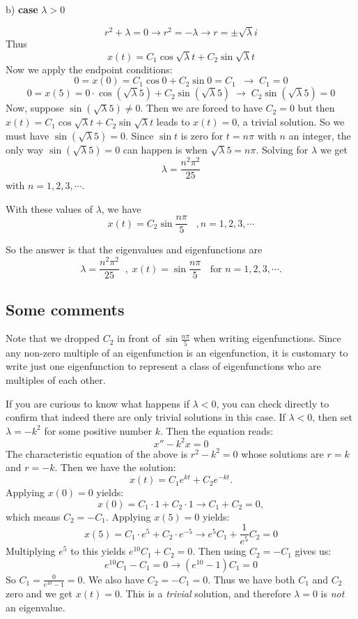 \documentclass[12pt]{report}
\begin{document}
b) \textbf{case } $\lambda>0$

$$r^2 + \lambda = 0 \rightarrow r^2 = - \lambda \rightarrow r = \pm \sqrt{\lambda} i $$
Thus
$$x(t) = C_1 \cos \sqrt{\lambda}t + C_2 \sin \sqrt{\lambda} t $$
Now we apply the endpoint conditions:
$$ 0 = x(0) = C_1 \cos 0 + C_2 \sin 0 = C_1 \; \; \rightarrow \; C_1 = 0 $$
$$ 0 = x(5) = 0\cdot \cos (\sqrt{\lambda} 5) + C_2 \sin (\sqrt{\lambda} 5)  \; \rightarrow \; C_2 \sin (\sqrt{\lambda} 5)=0$$
Now, suppose $\sin (\sqrt{\lambda} 5) \neq 0 $. Then we are forced to have $C_2 =0 $ but then $x(t) = C_1 \cos \sqrt{\lambda}t + C_2 \sin \sqrt{\lambda} t $ leads to $x(t) = 0 $, a trivial solution. So we must have $\sin (\sqrt{\lambda} 5) = 0 $.
Since $\sin t$ is zero for $t= n\pi$ with $n$ an integer, the only way $\sin (\sqrt{\lambda} 5) = 0 $ can happen is when $\sqrt{\lambda} 5 = n\pi $. Solving for $\lambda$ we get 
$$\lambda = \frac{n^2\pi^2}{25}$$
with $n= 1,2,3, \cdots $.

With these values of $\lambda$, we have
$$ x(t) = C_2 \sin \frac{n\pi}{5} \; \; \; , n= 1,2,3, \cdots$$

So the answer is that the eigenvalues and eigenfunctions are 
$$\lambda = \frac{n^2\pi^2}{25} \; \; , \; x(t)=\sin \frac{n\pi}{5} \; \; \textrm{ for }  n= 1,2,3, \cdots.$$ 

\subsection*{Some comments}

Note that we dropped $C_2$ in front of  $\sin \frac{n\pi}{5}$ when writing eigenfunctions. Since any non-zero multiple of an eigenfunction is an eigenfunction, it is customary to write just one eigenfunction to represent a class of eigenfunctions who are multiples of each other. 

If you are curious to know what happens if $\lambda<0$, you can check directly to confirm that indeed there are only trivial solutions in this case. If $\lambda<0$, then set $\lambda = - k^2$ for some positive number $k$. Then the equation reads:
$$ x'' - k^2 x =0 $$
The characteristic equation of the above is $r^2 -k^2=0$ whose solutions are $r=k$ and $r=-k$. Then we have the solution:
$$x(t) = C_1 e^{kt} + C_2 e^{-kt}. $$
Applying $x(0)=0$ yields:
$$x(0)= C_1\cdot 1 + C_2 \cdot 1  \rightarrow C_1+C_2=0,$$
which means $C_2=-C_1$.
Applying $x(5)=0$ yields:
$$x(5) = C_1\cdot e^5 + C_2 \cdot e^{-5} \rightarrow e^5 C_1 + \frac{1}{e^5} C_2 =0$$
Multiplying $e^5$ to this yields $e^{10} C_1 + C_2 =0$. Then using $C_2=-C_1$ gives us:
$$ e^10 C_1 -C_1 =0 \rightarrow (e^{10} -1) C_1 =0 $$
So $ C_1 = \frac{0}{e^{10} -1} =0 $. We also have $C_2 = -C_1 =0$. 
Thus we have both $C_1$ and $C_2$ zero and we get $x(t)=0$. This is a \textit{trivial} solution, and therefore $\lambda =0$ is \textit{not} an eigenvalue. 
\end{document}
